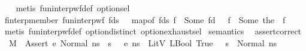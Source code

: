 \begin{isabellebody}
%
\isadelimproof
\ \ %
\endisadelimproof
%
\isatagproof
{}\isamarkupfalse%
\ {\isacharparenleft}{\kern0pt}metis\ fun{\isacharunderscore}{\kern0pt}interp{\isacharunderscore}{\kern0pt}wf{\isacharunderscore}{\kern0pt}def\ option{\isachardot}{\kern0pt}sel{\isacharparenright}{\kern0pt}%
\endisatagproof
{\isafoldproof}%
%
\isadelimproof
\isanewline
%
\endisadelimproof
\isanewline
{}\isamarkupfalse%
\ finterp{\isacharunderscore}{\kern0pt}member{\isacharcolon}{\kern0pt}\ {\isachardoublequoteopen}fun{\isacharunderscore}{\kern0pt}interp{\isacharunderscore}{\kern0pt}wf\ fds\ {\isasymGamma}\ {\isasymLongrightarrow}\ map{\isacharunderscore}{\kern0pt}of\ fds\ f\ {\isacharequal}{\kern0pt}\ Some\ fd\ {\isasymLongrightarrow}\ {\isasymGamma}\ f\ {\isacharequal}{\kern0pt}\ Some\ {\isacharparenleft}{\kern0pt}the\ {\isacharparenleft}{\kern0pt}{\isasymGamma}\ f{\isacharparenright}{\kern0pt}{\isacharparenright}{\kern0pt}{\isachardoublequoteclose}\isanewline
%
\isadelimproof
\ \ %
\endisadelimproof
%
\isatagproof
{}\isamarkupfalse%
\ {\isacharparenleft}{\kern0pt}metis\ fun{\isacharunderscore}{\kern0pt}interp{\isacharunderscore}{\kern0pt}wf{\isacharunderscore}{\kern0pt}def\ option{\isachardot}{\kern0pt}distinct{\isacharparenleft}{\kern0pt}{}{\isacharparenright}{\kern0pt}\ option{\isachardot}{\kern0pt}exhaust{\isacharunderscore}{\kern0pt}sel{\isacharparenright}{\kern0pt}%
\endisatagproof
{\isafoldproof}%
%
\isadelimproof
\isanewline
%
\endisadelimproof
\isanewline
\isanewline
{}\isamarkupfalse%
\ semantics\ \isanewline
\isanewline
{}\isamarkupfalse%
\ assert{\isacharunderscore}{\kern0pt}correct{\isacharcolon}{\kern0pt}\isanewline
\ \ {\isachardoublequoteopen}{\isasymlbrakk}M{\isacharcomma}{\kern0pt}{\isasymLambda}{\isacharcomma}{\kern0pt}{\isasymGamma}{\isacharcomma}{\kern0pt}{\isasymDelta}\ {\isasymturnstile}\ {\isasymlangle}Assert\ e{\isacharcomma}{\kern0pt}\ Normal\ n{\isacharunderscore}{\kern0pt}s{\isasymrangle}\ {\isasymrightarrow}\ s{\isacharsemicolon}{\kern0pt}\ {\isasymLambda}{\isacharcomma}{\kern0pt}{\isasymGamma}{\isacharcomma}{\kern0pt}{\isasymDelta}\ {\isasymturnstile}\ {\isasymlangle}e{\isacharcomma}{\kern0pt}\ n{\isacharunderscore}{\kern0pt}s{\isasymrangle}\ {\isasymDown}\ LitV\ {\isacharparenleft}{\kern0pt}LBool\ True{\isacharparenright}{\kern0pt}\ {\isasymrbrakk}\ {\isasymLongrightarrow}\ s\ {\isacharequal}{\kern0pt}\ Normal\ n{\isacharunderscore}{\kern0pt}s{\isachardoublequoteclose}\isanewline
%
\isadelimproof
\ \ %
\endisadelimproof
%
\isatagproof

\end{isabellebody}
